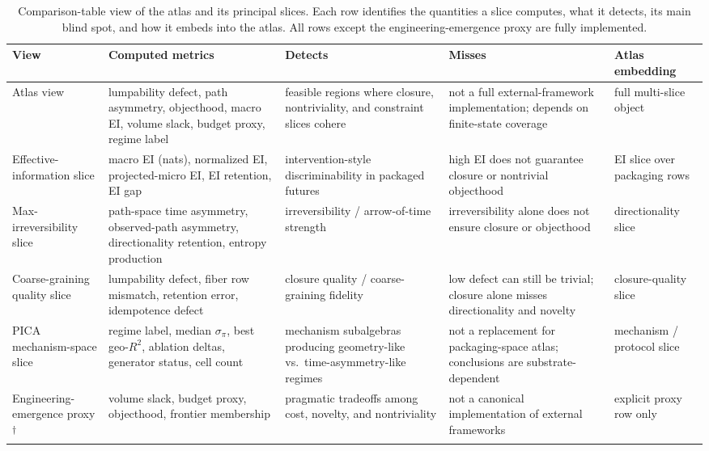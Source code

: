 \documentclass[11pt]{article}
\theoremstyle{definition}
\begin{document}
\begin{table}[t]
    \centering
    \caption{Comparison-table view of the atlas and its principal slices. Each row identifies the quantities a slice computes, what it detects, its main blind spot, and how it embeds into the atlas. All rows except the engineering-emergence proxy are fully implemented.}
    \label{fig:comparison_table}
    \smallskip
    {\small
    \setlength{\tabcolsep}{4pt}
    \renewcommand{\arraystretch}{1.08}
    \begin{tabularx}{\textwidth}{@{}>{\RaggedRight\arraybackslash}p{2.2cm}>{\RaggedRight\arraybackslash}X>{\RaggedRight\arraybackslash}p{2.4cm}>{\RaggedRight\arraybackslash}p{2.8cm}>{\RaggedRight\arraybackslash}p{2.0cm}@{}}
    \toprule
    \textbf{View} & \textbf{Computed metrics} & \textbf{Detects} & \textbf{Misses} & \textbf{Atlas embedding} \\
    \midrule
    Atlas view
      & lumpability defect, path asymmetry, objecthood, macro EI, volume slack, budget proxy, regime label
      & feasible regions where closure, nontriviality, and constraint slices cohere
      & not a full external-framework implementation; depends on finite-state coverage
      & full multi-slice object \\
    \addlinespace[3pt]
    Effective-information slice
      & macro EI (nats), normalized EI, projected-micro EI, EI retention, EI gap
      & intervention-style discriminability in packaged futures
      & high EI does not guarantee closure or nontrivial objecthood
      & EI slice over packaging rows \\
    \addlinespace[3pt]
    Max-irreversibility slice
      & path-space time asymmetry, observed-path asymmetry, directionality retention, entropy production
      & irreversibility / arrow-of-time strength
      & irreversibility alone does not ensure closure or objecthood
      & directionality slice \\
    \addlinespace[3pt]
    Coarse-graining quality slice
      & lumpability defect, fiber row mismatch, retention error, idempotence defect
      & closure quality / coarse-graining fidelity
      & low defect can still be trivial; closure alone misses directionality and novelty
      & closure-quality slice \\
    \addlinespace[3pt]
    PICA mechanism-space slice
      & regime label, median $\sigma_\pi$, best geo-$R^2$, ablation deltas, generator status, cell count
      & mechanism subalgebras producing geometry-like vs.\ time-asymmetry-like regimes
      & not a replacement for packaging-space atlas; conclusions are substrate-dependent
      & mechanism / protocol slice \\
    \addlinespace[3pt]
    Engineering-emergence proxy\textsuperscript{$\dagger$}
      & volume slack, budget proxy, objecthood, frontier membership
      & pragmatic tradeoffs among cost, novelty, and nontriviality
      & not a canonical implementation of external frameworks
      & explicit proxy row only \\
    \bottomrule
    \end{tabularx}
    }


\end{table}
\end{document}
